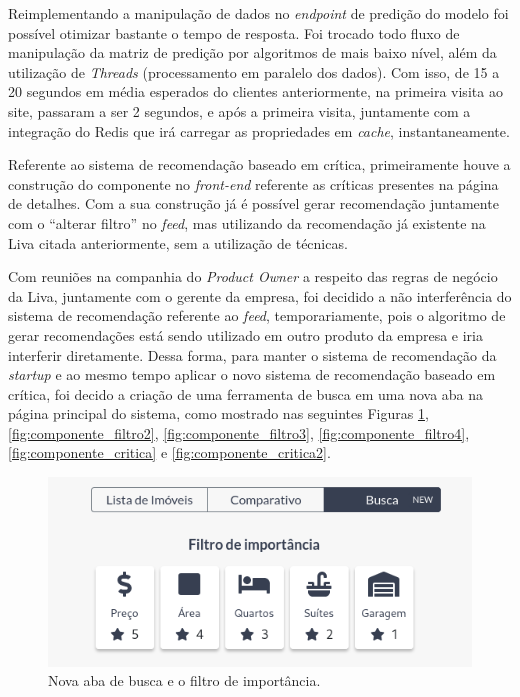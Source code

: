 Reimplementando a manipulação de dados no \textit{endpoint} de predição do modelo foi possível otimizar bastante o tempo de resposta. Foi trocado todo fluxo de manipulação da matriz de predição por algoritmos de mais baixo nível, além da utilização de \textit{Threads} (processamento em paralelo dos dados). Com isso, de 15 a 20 segundos em média esperados do clientes anteriormente, na primeira visita ao site, passaram a ser 2 segundos, e após a primeira visita, juntamente com a integração do Redis que irá carregar as propriedades em \textit{cache}, instantaneamente.

Referente ao sistema de recomendação baseado em crítica, primeiramente houve a construção do componente no \textit{front-end} referente as críticas presentes na página de detalhes. Com a sua construção já é possível gerar recomendação juntamente com o “alterar filtro'' no \textit{feed}, mas utilizando da recomendação já existente na Liva citada anteriormente, sem a utilização de técnicas.

Com reuniões na companhia do \textit{Product Owner} a respeito das regras de negócio da Liva, juntamente com o gerente da empresa, foi decidido a não interferência do sistema de recomendação referente ao \textit{feed}, temporariamente, pois o algoritmo de gerar recomendações está sendo utilizado em outro produto da empresa e iria interferir diretamente. Dessa forma, para manter o sistema de recomendação da \textit{startup} e ao mesmo tempo aplicar o novo sistema de recomendação baseado em crítica, foi decido a criação de uma ferramenta de busca em uma nova aba na página principal do sistema, como mostrado nas seguintes Figuras \ref{fig:componente_filtro}, \ref{fig:componente_filtro2}, \ref{fig:componente_filtro3}, \ref{fig:componente_filtro4}, \ref{fig:componente_critica} e \ref{fig:componente_critica2}.

\begin{figure}[H]
    \centering
    \includegraphics[scale=0.5]{figuras/desenvolvimento/componente_filtro.png}
    \caption[Nova aba de busca e o filtro de importância]{Nova aba de busca e o filtro de importância.}
    \label{fig:componente_filtro}
\end{figure}


